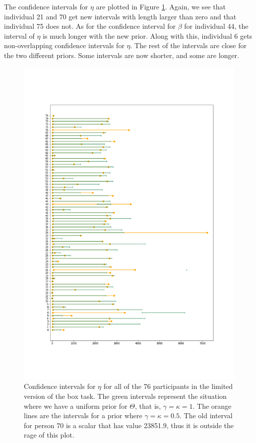 The confidence intervals for $\eta$ are plotted in Figure \ref{fig:sensitivity_ci_lim_eta}. Again, we see that individual 21 and 70  get new intervals with length larger than zero and that individual 75 does not. As for the confidence interval for $\beta$ for individual 44, the interval of $\eta$ is much longer with the new prior. Along with this, individual 6 gets non-overlapping confidence intervals for $\eta$. The rest of the intervals are close for the two different priors. Some intervals are now shorter, and some are longer. 
\begin{figure}
    \centering
    \includegraphics[scale=0.37]{pictures/Sensitivity/ci_lim_eta_zoomed.png}
    \caption[CIs for $\eta$ for all participants with two different priors, limited]{Confidence intervals for $\eta$ for all of the 76 participants in the limited version of the box task. The green intervals represent the situation where we have a uniform prior for $\Theta$, that is, $\gamma=\kappa=1$. The orange lines are the intervals for a prior where $\gamma=\kappa=0.5$. The old interval for person 70 is a scalar that has value 23851.9, thus it is outside the rage of this plot.}
    \label{fig:sensitivity_ci_lim_eta}
\end{figure}


